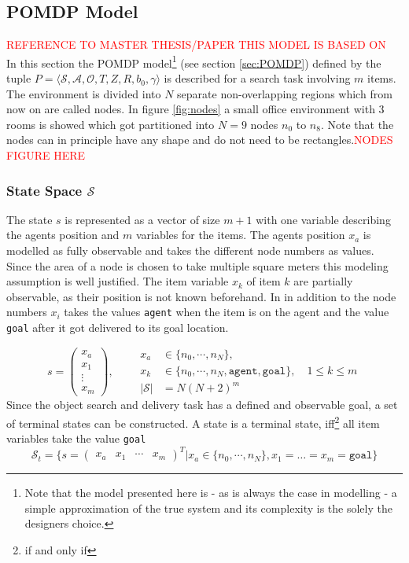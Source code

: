 \subsection{POMDP Model}
\textcolor{red}{REFERENCE TO MASTER THESIS/PAPER THIS MODEL IS BASED ON}\\
In this section the POMDP model\footnote{Note that the model presented here is - as is always the case in modelling - a simple approximation of the true system and its complexity is the solely the designers choice.} (see section \ref{sec:POMDP}) defined by the tuple $P = \langle \mathcal{S}, \mathcal{A}, \mathcal{O}, T, Z, R, b_0, \gamma \rangle$ is described for a search task involving $m$ items. The environment is divided into $N$ separate non-overlapping regions which from now on are called nodes. In figure \ref{fig:nodes} a small office environment with 3 rooms is showed which got partitioned into $N=9$ nodes $n_0$ to $n_8$. Note that the nodes can in principle have any shape and do not need to be rectangles.\textcolor{red}{NODES FIGURE HERE}\\
\subsubsection{State Space $\mathcal{S}$}
The state $s$ is represented as a vector of size $m+1$ with one variable describing the agents position and $m$ variables for the items. The agents position $x_a$ is modelled as fully observable and takes the different node numbers as values. Since the area of a node is chosen to take multiple square meters this modeling assumption is well justified. The item variable $x_k$ of item $k$ are partially observable, as their position is not known beforehand. In in addition to the node numbers $x_i$ takes the values \texttt{agent} when the item is on the agent and the value \texttt{goal} after it got delivered to its goal location.

\begin{equation}
    s=\begin{pmatrix} x_a \\ x_1 \\ \vdots \\ x_m \end{pmatrix}, \qquad \begin{aligned} x_a&\in\{n_0, \cdots, n_N\},\\ 
    x_k &\in \{n_0, \cdots, n_N, \texttt{agent}, \texttt{goal}\}, \quad 1 \leq k \leq m \\
    |\mathcal{S}| &= N(N+2)^m \end{aligned}
\end{equation}
Since the object search and delivery task has a defined and observable goal, a set of terminal states can be constructed. A state is a terminal state, iff\footnote{if and only if} all item variables take the value \texttt{goal}
\begin{equation}
    \mathcal{S}_t = \{s=\begin{pmatrix} x_a & x_1 & \cdots & x_m \end{pmatrix}^T | x_a\in \{n_0, \cdots, n_N\}, x_1=\ldots=x_m=\texttt{goal}\}
\end{equation}
